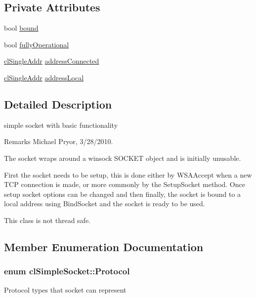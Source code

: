 \subsection*{Private Attributes}
\begin{DoxyCompactItemize}
\item 
bool \hyperlink{classcl_simple_socket_a780c2c352ef115d7194c401566126a20}{bound}
\item 
bool \hyperlink{classcl_simple_socket_afa5ce1a66de16e6184770e528fd0a03f}{fullyOperational}
\item 
\hyperlink{classcl_single_addr}{clSingleAddr} \hyperlink{classcl_simple_socket_ae777e37939afd56e6bde9c3513ad7b75}{addressConnected}
\item 
\hyperlink{classcl_single_addr}{clSingleAddr} \hyperlink{classcl_simple_socket_aab91a0e6aae916c873175e7ff04bbc50}{addressLocal}
\end{DoxyCompactItemize}


\subsection{Detailed Description}
simple socket with basic functionality \begin{DoxyRemark}{Remarks}
Michael Pryor, 3/28/2010.
\end{DoxyRemark}
The socket wraps around a winsock SOCKET object and is initially unusable. \par
 First the socket needs to be setup, this is done either by WSAAccept when a new TCP connection is made, or more commonly by the SetupSocket method. Once setup socket options can be changed and then finally, the socket is bound to a local address using BindSocket and the socket is ready to be used.\par
\par


This class is not thread safe. 

\subsection{Member Enumeration Documentation}
\hypertarget{classcl_simple_socket_affcd3d22c1abba5d20a0ae93472c576d}{
\subsubsection[{Protocol}]{\setlength{\rightskip}{0pt plus 5cm}enum {\bf clSimpleSocket::Protocol}}}
\label{classcl_simple_socket_affcd3d22c1abba5d20a0ae93472c576d}
Protocol types that socket can represent 

